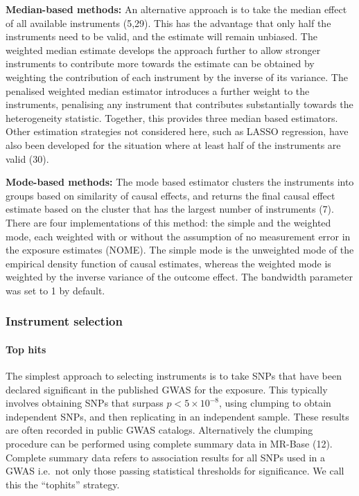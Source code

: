 \documentclass[]{article}
\let\oldparagraph\paragraph
\renewcommand{\paragraph}[1]{\oldparagraph{#1}\mbox{}}
\begin{document}
\textbf{Median-based methods:} An alternative approach is to take the
median effect of all available instruments (5,29). This has the
advantage that only half the instruments need to be valid, and the
estimate will remain unbiased. The weighted median estimate develops the
approach further to allow stronger instruments to contribute more
towards the estimate can be obtained by weighting the contribution of
each instrument by the inverse of its variance. The penalised weighted
median estimator introduces a further weight to the instruments,
penalising any instrument that contributes substantially towards the
heterogeneity statistic. Together, this provides three median based
estimators. Other estimation strategies not considered here, such as
LASSO regression, have also been developed for the situation where at
least half of the instruments are valid (30).

\textbf{Mode-based methods:} The mode based estimator clusters the
instruments into groups based on similarity of causal effects, and
returns the final causal effect estimate based on the cluster that has
the largest number of instruments (7). There are four implementations of
this method: the simple and the weighted mode, each weighted with or
without the assumption of no measurement error in the exposure estimates
(NOME). The simple mode is the unweighted mode of the empirical density
function of causal estimates, whereas the weighted mode is weighted by
the inverse variance of the outcome effect. The bandwidth parameter was
set to 1 by default.

\subsubsection{Instrument selection}\label{instrument-selection}

\paragraph{Top hits}\label{top-hits}

The simplest approach to selecting instruments is to take SNPs that have
been declared significant in the published GWAS for the exposure. This
typically involves obtaining SNPs that surpass \(p < 5 \times 10^{-8}\),
using clumping to obtain independent SNPs, and then replicating in an
independent sample. These results are often recorded in public GWAS
catalogs. Alternatively the clumping procedure can be performed using
complete summary data in MR-Base (12). Complete summary data refers to
association results for all SNPs used in a GWAS i.e.~not only those
passing statistical thresholds for significance. We call this the
``tophits'' strategy.
\end{document}
